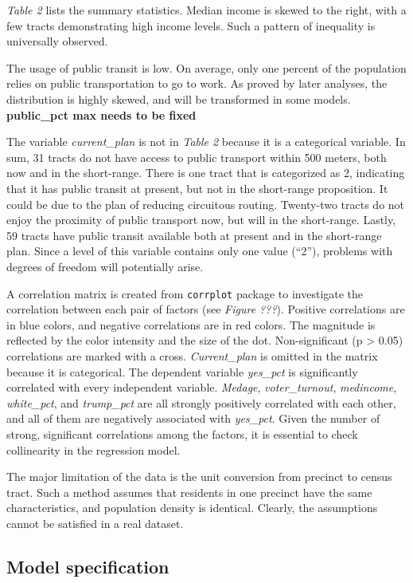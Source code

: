 \documentclass[
]{article}
\begin{document}
\emph{Table 2} lists the summary statistics. Median income is skewed to
the right, with a few tracts demonstrating high income levels. Such a
pattern of inequality is universally observed.

The usage of public transit is low. On average, only one percent of the
population relies on public transportation to go to work. As proved by
later analyses, the distribution is highly skewed, and will be
transformed in some models. \textbf{public\_pct max needs to be fixed}

The variable \emph{current\_plan} is not in \emph{Table 2} because it is
a categorical variable. In sum, 31 tracts do not have access to public
transport within 500 meters, both now and in the short-range. There is
one tract that is categorized as 2, indicating that it has public
transit at present, but not in the short-range proposition. It could be
due to the plan of reducing circuitous routing. Twenty-two tracts do not
enjoy the proximity of public transport now, but will in the
short-range. Lastly, 59 tracts have public transit available both at
present and in the short-range plan. Since a level of this variable
contains only one value (``2''), problems with degrees of freedom will
potentially arise.

A correlation matrix is created from \texttt{corrplot} package to
investigate the correlation between each pair of factors (see
\emph{Figure ???}). Positive correlations are in blue colors, and
negative correlations are in red colors. The magnitude is reflected by
the color intensity and the size of the dot. Non-significant (p
\textgreater{} 0.05) correlations are marked with a cross.
\emph{Current\_plan} is omitted in the matrix because it is categorical.
The dependent variable \emph{yes\_pct} is significantly correlated with
every independent variable. \emph{Medage}, \emph{voter\_turnout},
\emph{medincome}, \emph{white\_pct}, and \emph{trump\_pct} are all
strongly positively correlated with each other, and all of them are
negatively associated with \emph{yes\_pct}. Given the number of strong,
significant correlations among the factors, it is essential to check
collinearity in the regression model.

The major limitation of the data is the unit conversion from precinct to
census tract. Such a method assumes that residents in one precinct have
the same characteristics, and population density is identical. Clearly,
the assumptions cannot be satisfied in a real dataset.

\hypertarget{model-specification}{%
\subsection{Model specification}\label{model-specification}}
\end{document}
